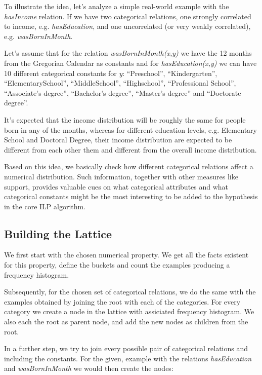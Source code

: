 To illustrate the idea, let's analyze a simple real-world example with the \emph{hasIncome} relation. If we have two
categorical relations, one strongly correlated to income, e.g. \emph{hasEducation}, and one uncorrelated (or very weakly
correlated), e.g. \emph{wasBornInMonth}.

Let's assume that for the relation \emph{wasBornInMonth(x,y)} we have the 12 months from the Gregorian Calendar as
constants and for \emph{hasEducation(x,y)} we can have 10 different categorical constants for \emph{y}: ``Preschool'',
``Kindergarten'', ``ElementarySchool'', ``MiddleSchool'', ``Highschool'', ``Professional School'', ``Associate's
degree'', ``Bachelor's degree'', ``Master's degree'' and ``Doctorate degree''. 

It's expected that the income distribution will be roughly the same for people born in any of the months, whereas
for different education levels, e.g. Elementary School and Doctoral Degree, their income distribution are expected to be
different from each other them and different from the overall income distribution.

Based on this idea, we basically check how different categorical relations affect a numerical distribution. Such
information, together with other measures like support, provides valuable cues on what categorical attributes and what
categorical constants might be the most interesting to be added to the hypothesis in the core ILP algorithm.

\subsection{Building the Lattice}

We first start with the chosen numerical property. We get all the facts existent for this property, define the buckets
and count the examples producing a frequency histogram.

Subsequently, for the chosen set of categorical relations, we do the same with the examples obtained by joining the root
with each of the categories. For every category we create a node in the lattice with assiciated frequency histogram. We
also each the root as parent node, and add the new nodes as children from the root.

In a further step, we try to join every possible pair of categorical relations and including the constants. For the
given, example with the relations \emph{hasEducation} and \emph{wasBornInMonth} we would then create the nodes:

